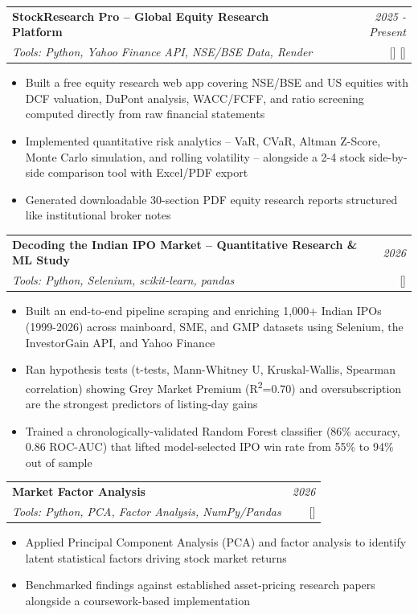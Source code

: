 \documentclass[a4paper,11pt]{article}
\makeatletter
\newcommand{\resumeProject}[4]{
\vspace{0.5mm}\item
    \begin{tabular*}{0.98\textwidth}[t]{l@{\extracolsep{\fill}}r}
        \textbf{#1} & \textit{\footnotesize{#3}} \\
        \footnotesize{\textit{#2}} & \footnotesize{#4}
    \end{tabular*}
    \vspace{-2.4mm}
}
\newcommand{\resumeItemListStart}{\begin{itemize}[leftmargin=*,labelsep=1mm,itemsep=0.5mm]}
\newcommand{\resumeItemListEnd}{\end{itemize}\vspace{-2mm}}
\makeatother
\begin{document}
\resumeProject
  {StockResearch Pro -- Global Equity Research Platform}
  {Tools: Python, Yahoo Finance API, NSE/BSE Data, Render}
  {2025 - Present}
  {{}[\href{https://github.com/amansingh2116/stock_research_report}{\textcolor{darkblue}{\faGithub}}]
  [\href{https://stock-research-report.onrender.com/}{\textcolor{darkblue}{\faIcon{globe}}}]}
\resumeItemListStart
  \item Built a free equity research web app covering NSE/BSE and US equities with DCF valuation, DuPont analysis, WACC/FCFF, and ratio screening computed directly from raw financial statements
  \item Implemented quantitative risk analytics -- VaR, CVaR, Altman Z-Score, Monte Carlo simulation, and rolling volatility -- alongside a 2-4 stock side-by-side comparison tool with Excel/PDF export
  \item Generated downloadable 30-section PDF equity research reports structured like institutional broker notes
\resumeItemListEnd

\resumeProject
  {Decoding the Indian IPO Market -- Quantitative Research \& ML Study}
  {Tools: Python, Selenium, scikit-learn, pandas}
  {2026}
  {{}[\href{https://beyondbooks2116.netlify.app/ipo/}{\textcolor{darkblue}{\faIcon{globe}}}]}
\resumeItemListStart
  \item Built an end-to-end pipeline scraping and enriching 1,000+ Indian IPOs (1999-2026) across mainboard, SME, and GMP datasets using Selenium, the InvestorGain API, and Yahoo Finance
  \item Ran hypothesis tests (t-tests, Mann-Whitney U, Kruskal-Wallis, Spearman correlation) showing Grey Market Premium (R\textsuperscript{2}=0.70) and oversubscription are the strongest predictors of listing-day gains
  \item Trained a chronologically-validated Random Forest classifier (86\% accuracy, 0.86 ROC-AUC) that lifted model-selected IPO win rate from 55\% to 94\% out of sample
\resumeItemListEnd

\resumeProject
  {Market Factor Analysis}
  {Tools: Python, PCA, Factor Analysis, NumPy/Pandas}
  {2026}
  {{}[\href{https://github.com/amansingh2116/market-factor-analysis}{\textcolor{darkblue}{\faGithub}}]}
\resumeItemListStart
  \item Applied Principal Component Analysis (PCA) and factor analysis to identify latent statistical factors driving stock market returns
  \item Benchmarked findings against established asset-pricing research papers alongside a coursework-based implementation
\resumeItemListEnd
\end{document}
